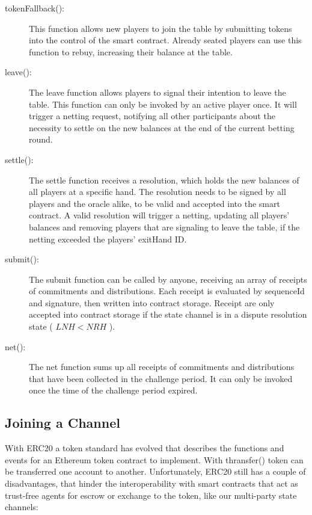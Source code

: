 \begin{description}
\item[tokenFallback():] This function allows new players to join the table by submitting tokens into the control of the smart contract. Already seated players can use this function to rebuy, increasing their balance at the table. 
\item[leave():] The leave function allows players to signal their intention to leave the table. This function can only be invoked by an active player once. It will trigger a netting request, notifying all other participants about the necessity to settle on the new balances at the end of the current betting round.
\item[settle():] The settle function receives a resolution, which holds the new balances of all players at a specific hand. The resolution needs to be signed by all players and the oracle alike, to be valid and accepted into the smart contract. A valid resolution will trigger a netting, updating all players' balances and removing players that are signaling to leave the table, if the netting exceeded the players' exitHand ID.
\item[submit():] The submit function can be called by anyone, receiving an array of receipts of commitments and distributions. Each receipt is evaluated by sequenceId and signature, then written into contract storage. Receipt are only accepted into contract storage if the state channel is in a dispute resolution state ( \(LNH < NRH\) ).
\item[net():] The net function sums up all receipts of commitments and distributions that have been collected in the challenge period. It can only be invoked once the time of the challenge period expired.
\end{description}



\subsection{Joining a Channel}

With ERC20 a token standard has evolved that describes the functions and events for an Ethereum token contract  to implement. With thransfer() token can be transferred one account to another. Unfortunately, ERC20 still has a couple of disadvantages, that hinder the interoperability with smart contracts that act as trust-free agents for escrow or exchange to the token, like our multi-party state channels:

